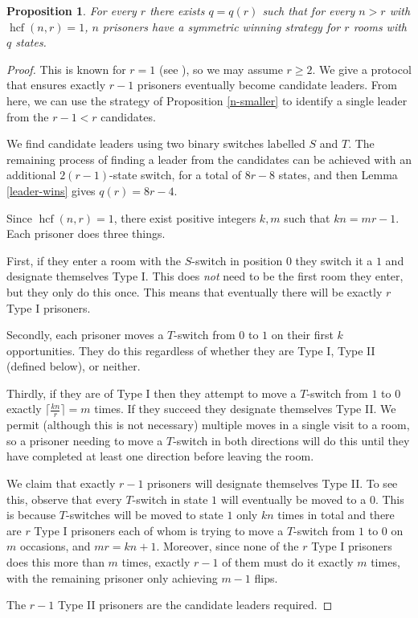 \documentclass[a4paper,11pt]{extarticle}
\newtheorem{proposition}[theorem]{Proposition}
\theoremstyle{definition}
\theoremstyle{remark}
\newcommand{\hcf}{\operatorname{hcf}}
\begin{document}
	\begin{proposition}\label{r-smaller}
		For every $r$ there exists $q=q(r)$ such that for every $n>r$ with $\hcf(n,r)=1$, $n$ prisoners have a symmetric winning strategy for $r$ rooms with $q$ states.
	\end{proposition}
	\begin{proof}This is known for $r=1$ (see \cite{Win04}), so we may assume $r\geq 2$.
		We give a protocol that ensures exactly $r-1$ prisoners eventually become candidate leaders. From here, we can use the strategy of Proposition \ref{n-smaller} to identify a single leader from the $r-1<r$ candidates. 
		
		We find candidate leaders using two binary switches labelled $S$ and $T$. The remaining process of finding a leader from the candidates can be achieved with an additional $2(r-1)$-state switch, for a total of $8r-8$ states, and then Lemma \ref{leader-wins} gives $q(r)=8r-4$.
		
		Since $\hcf(n,r)=1$, there exist positive integers $k,m$ such that $kn=mr-1$. Each prisoner does three things. 
		
		First, if they enter a room with the $S$-switch in position $0$ they switch it a $1$ and designate themselves Type I. This does \emph{not} need to be the first room they enter, but they only do this once. This means that eventually there will be exactly $r$ Type I prisoners.
		
		Secondly, each prisoner moves a $T$-switch from $0$ to $1$ on their first $k$ opportunities. They do this regardless of whether they are Type I, Type II (defined below), or neither.
		
		Thirdly, if they are of Type I then they attempt to move a $T$-switch from $1$ to $0$ exactly $\lceil \frac{kn}{r}\rceil=m$ times. If they succeed they designate themselves Type II. We permit (although this is not necessary) multiple moves in a single visit to a room, so a prisoner needing to move a $T$-switch in both directions will do this until they have completed at least one direction before leaving the room.
		
		We claim that exactly $r-1$ prisoners will designate themselves Type II. To see this, observe that every $T$-switch in state $1$ will eventually be moved to a $0$. This is because $T$-switches will be moved to state $1$ only $kn$ times in total and there are $r$ Type I prisoners each of whom is trying to move a $T$-switch from $1$ to $0$ on $m$ occasions, and $mr=kn+1$. Moreover, since none of the $r$ Type I prisoners does this more than $m$ times, exactly $r-1$ of them must do it exactly $m$ times, with the remaining prisoner only achieving $m-1$ flips.
		
		The $r-1$ Type II prisoners are the candidate leaders required.
	\end{proof}
	
\end{document}
